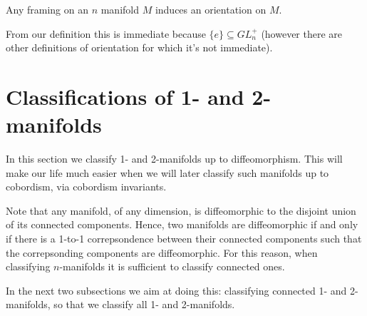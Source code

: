 \begin{lem}
    Any framing on an $n$ manifold $M$ induces an orientation on $M$.
\end{lem}
\noindent From our definition this is immediate because $\{e\} \subseteq GL_n^+$ (however there are other definitions of orientation for which it's not immediate).


\section{Classifications of 1- and 2-manifolds}
In this section we classify 1- and 2-manifolds up to diffeomorphism. This will make our life much easier 
when we will later classify such manifolds up to cobordism, via cobordism invariants.

Note that any manifold, of any dimension, is diffeomorphic to the disjoint union of its connected
 components. Hence, two manifolds are diffeomorphic if and only if there is a 1-to-1 correpsondence 
  between their connected components such that the correpsonding components are diffeomorphic.
  For this reason, when classifying $n$-manifolds it is sufficient to classify connected ones. 
  
  In the next two subsections we aim at doing this: classifying connected 1- and 2-manifolds,
  so that we classify all 1- and 2-manifolds.
